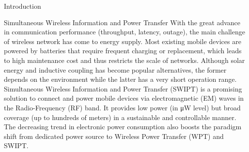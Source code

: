 \documentclass{IEEEtran}
\begin{document}
\begin{section}{Introduction}
	\begin{subsection}{Simultaneous Wireless Information and Power Transfer}
		With the great advance in communication performance (throughput, latency, outage), the main challenge of wireless network has come to energy supply. Most existing mobile devices are powered by batteries that require frequent charging or replacement, which leads to high maintenance cost and thus restricts the scale of networks. Although solar energy and inductive coupling has become popular alternatives, the former depends on the environment while the latter has a very short operation range. Simultaneous Wireless Information and Power Transfer (SWIPT) is a promising solution to connect and power mobile devices via electromagnetic (EM) waves in the Radio-Frequency (RF) band. It provides low power (in \si{\uW} level) but broad coverage (up to hundreds of meters) \cite{Ng2018} in a sustainable and controllable manner. The decreasing trend in electronic power consumption also boosts the paradigm shift from dedicated power source to Wireless Power Transfer (WPT) and SWIPT.


\end{subsection}
\end{section}
\end{document}
